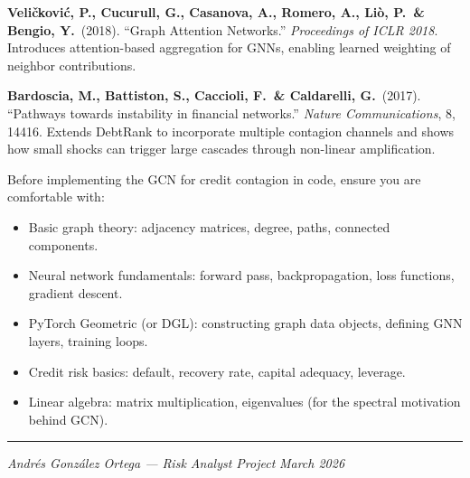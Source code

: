 \documentclass[11pt, a4paper]{article}
\theoremstyle{definition}
\theoremstyle{plain}
\theoremstyle{remark}
\begin{document}
\begin{enumerate}[label={[\arabic*]}, leftmargin=2cm]
    \item \textbf{Veli\v{c}kovi\'c, P., Cucurull, G., Casanova, A., Romero, A.,
          Li\`o, P.\ \& Bengio, Y.}\ (2018).
          ``Graph Attention Networks.''
          \emph{Proceedings of ICLR 2018}.
          Introduces attention-based aggregation for GNNs, enabling learned
          weighting of neighbor contributions.

    \item \textbf{Bardoscia, M., Battiston, S., Caccioli, F.\ \& Caldarelli, G.}\ (2017).
          ``Pathways towards instability in financial networks.''
          \emph{Nature Communications}, 8, 14416.
          Extends DebtRank to incorporate multiple contagion channels and shows
          how small shocks can trigger large cascades through non-linear amplification.
\end{enumerate}

\begin{prereq}
Before implementing the GCN for credit contagion in code, ensure you are comfortable with:
\begin{itemize}
    \item Basic graph theory: adjacency matrices, degree, paths, connected components.
    \item Neural network fundamentals: forward pass, backpropagation, loss functions,
          gradient descent.
    \item PyTorch Geometric (or DGL): constructing graph data objects, defining GNN
          layers, training loops.
    \item Credit risk basics: default, recovery rate, capital adequacy, leverage.
    \item Linear algebra: matrix multiplication, eigenvalues (for the spectral motivation
          behind GCN).
\end{itemize}
\end{prereq}

\vfill
\hrule
\smallskip
\noindent\textit{Andr\'es Gonz\'alez Ortega --- Risk Analyst Project} \hfill \textit{March 2026}
\end{document}
